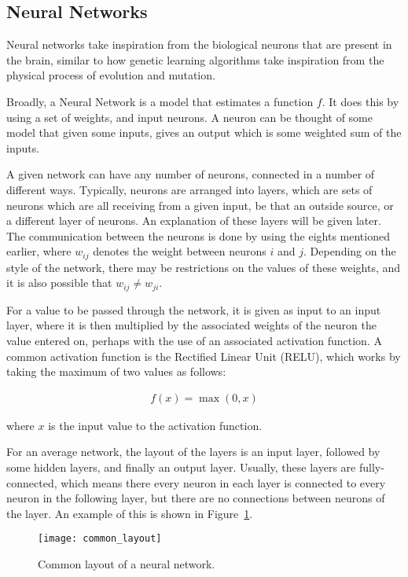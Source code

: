 \subsection{Neural Networks}

Neural networks take inspiration from the biological neurons that
are present in the brain, similar to how genetic learning
algorithms take inspiration from the physical process of evolution
and mutation\cite{goldberg2006genetic}.

Broadly, a Neural Network is a model that estimates a function $f$.
It does this by using a set of weights, and input neurons. A neuron
can be thought of some model that given some inputs, gives
an output which is some weighted sum of the inputs.

A given network can have any number of neurons, connected in a number
of different ways. Typically, neurons are arranged into layers, which
are sets of neurons which are all receiving from a given input, be
that an outside source, or a different layer of neurons. An explanation of
these layers will be given later. The communication
between the neurons is done by using the eights mentioned earlier, where
$w_{ij}$ denotes the weight between neurons $i$ and $j$. Depending on the
style of the network, there may be restrictions on the values of these
weights, and it is also possible that $w_{ij} \ne w_{ji}$.

For a value to be passed through the network, it is given as input to an input
layer, where it is then multiplied by the associated weights of the neuron the
value entered on, perhaps with the use of an associated activation function. A
common activation function is the Rectified Linear Unit
(RELU)\cite{Nair:2010:RLU:3104322.3104425}, which works by taking the maximum
of two values as follows:

\begin{align}
    f(x) = \max(0, x)
\end{align}

where $x$ is the input value to the activation function.

For an average network, the layout of the layers is an input layer,
followed by some hidden layers, and finally an output layer. Usually,
these layers are fully-connected, which means there every neuron in each
layer is connected to every neuron in the following layer, but
there are no connections between neurons of the layer. An example of this
is shown in Figure~\ref{fig:common_layout}.

\begin{figure}
    \centering
    \texttt{[image: common\_layout]}
    \caption{Common layout of a neural network.}%
    \label{fig:common_layout}
\end{figure}

